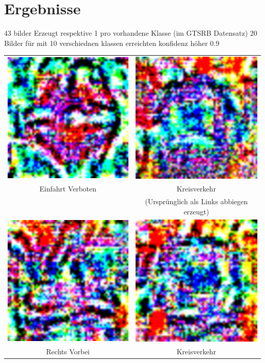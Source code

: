 \section{Ergebnisse}
43 bilder Erzeugt respektive 1 pro vorhandene Klasse (im GTSRB Datensatz)
20 Bilder für mit 10 verschiednen klassen erreichten konfidenz höher 0.9

\begin{tabular}{cc}
	\centering
	\includegraphics[width=.23\linewidth]{Images/AnPe/17_Einfahrtverbot} &\includegraphics[width=.23\linewidth]{Images/AnPe/34_kreisverkehr_origTurnleft}  \\
	Einfahrt Verboten & Kreisverkehr \\
	& (Ursprünglich als Links abbiegen erzeugt)\\
	\includegraphics[width=.23\linewidth]{Images/AnPe/39_RechtsVorbeiOrigLinksvorbei} &\includegraphics[width=.23\linewidth]{Images/AnPe/40_kreisverkehr}  \\
	Rechts Vorbei& Kreisverkehr\\
\end{tabular}